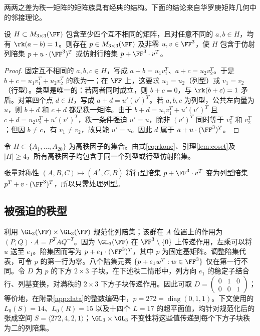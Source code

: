 \documentclass[11pt,a4paper]{article}
\begin{document}
两两之差为秩一矩阵的矩阵族具有经典的结构。下面的结论来自华罗庚矩阵几何中的邻接理论\cite{hua1945geometries,wan1996geometry,pazzis2015hua}。

\begin{lemma}[陪集结构]\label{lem:coset}
  设 $H\subset M_{3\times3}(\FF)$ 包含至少四个互不相同的矩阵，且对任意不同的 $a,b\in H$，均有 $\rk(a-b)=1$。则存在 $p\in M_{3\times3}(\FF)$ 及非零 $u,v\in\FF^3$，使 $H$ 包含于仿射列陪集 $p+u\cdot(\FF^3)^T$ 或仿射行陪集 $p+\FF^3\cdot v^T$。
\end{lemma}

\begin{proof}
  固定互不相同的 $a,b,c\in H$，写成 $a+b=u_1v_1^T$、$a+c=u_2v_2^T$。于是 $b+c=u_1v_1^T+u_2v_2^T$ 的秩为一；在 $\FF$ 上，这要求 $u_1=u_2$（列型）或 $v_1=v_2$（行型）。类型是唯一的：若两者同时成立，则 $b+c=0$，与 $\rk(b+c)=1$ 矛盾。对第四个点 $d\in H$，写成 $a+d=u'(v')^T$。若 $a,b,c$ 为列型，公共左向量为 $u$，则 $b+d$ 和 $c+d$ 都是秩一矩阵。由于 $b+d=u_1v_1^T+u'(v')^T$ 且 $c+d=u_2v_2^T+u'(v')^T$，秩一条件强迫 $u'=u$，除非 $(v')^T$ 同时等于 $v_1^T$ 和 $v_2^T$；但因 $b\ne c$，有 $v_1\ne v_2$，故只能 $u'=u$。因此 $d$ 属于 $a+u\cdot(\FF^3)^T$。
\end{proof}

令 $H\subset\{A_1,\ldots,A_{20}\}$ 为高秩因子的集合。由式\eqref{eq:rkone}、引理\ref{lem:coset}及 $|H|\ge4$，所有高秩因子均包含于同一个列型或行型仿射陪集。

张量对称性 $(A,B,C)\mapsto(A^T,C,B)$ 将行型陪集 $p+\FF^3\cdot v^T$ 变为列型陪集 $p^T+v\cdot(\FF^3)^T$，所以只需处理列型。

\subsection{被强迫的秩型}

利用 $\GL_3(\FF)\times\GL_3(\FF)$ 规范化列陪集；该群在 $A$ 位置上的作用为 $(P,Q)\cdot A=P^TAQ^{-T}$。因为 $\GL_3(\FF)$ 在 $\FF^3\setminus\{0\}$ 上传递作用，左乘可以将 $u$ 送至 $e_1$。陪集因而写为 $p+e_1\cdot(\FF^3)^T$，其中 $p$ 为固定基矩阵。调整陪集代表，可令 $p$ 的第一行为零。八个陪集元素 $\{p+e_1w^T:w\in\FF^3\}$ 仅在第一行不同。令 $D$ 为 $p$ 的下方 $2\times3$ 子块。在下述秩二情形中，列方向 $e_1$ 的稳定子结合行、列基变换，对满秩的 $2\times3$ 下方子块传递作用。因此可取 $D=\left(\begin{smallmatrix}0&1&0\\0&0&1\end{smallmatrix}\right)$；等价地，在附录\ref{app:data}的整数编码中，$p=272=\operatorname{diag}(0,1,1)$。下文使用的 $L_0(S)=14$、$L_0(R)=15$ 以及十四个 $L=17$ 的超平面值，均针对规范化后的张成空间 $S=\langle272,4,2,1\rangle$；$\GL_3\times\GL_3$ 不变性将这些值传递到每个下方子块秩为二的列陪集。
\end{document}
